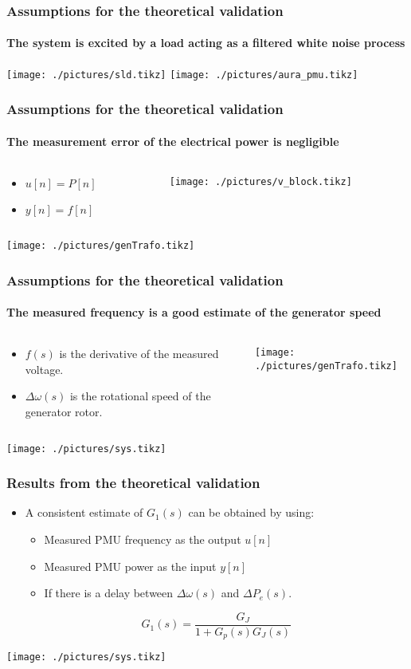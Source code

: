 \begin{frame}
	\frametitle{Assumptions for the theoretical validation}
	\framesubtitle{The system is excited by a load acting as a filtered white noise process}
	\texttt{[image: ./pictures/sld.tikz]}
	\texttt{[image: ./pictures/aura\_pmu.tikz]}
\end{frame}
\begin{frame}
	\frametitle{Assumptions for the theoretical validation}
	\framesubtitle{The measurement error of the electrical power is negligible}
	\begin{columns}
		\begin{column}{0.5\textwidth}
			\begin{itemize}
				\item $u[n] = P[n]$
				\item $y[n] = f[n]$
			\end{itemize}
		\end{column}
		\begin{column}{0.5\textwidth}
			\texttt{[image: ./pictures/v\_block.tikz]}
		\end{column}
	\end{columns}
	\texttt{[image: ./pictures/genTrafo.tikz]}
\end{frame}
\begin{frame}
	\frametitle{Assumptions for the theoretical validation}
	\framesubtitle{The measured frequency is a good estimate of the generator speed}
	\begin{columns}
		\begin{column}{0.35\textwidth}
			\begin{itemize}
				\item $f(s)$ is the derivative of the measured voltage.
				\item $\Delta \omega(s)$ is the rotational speed of the generator rotor.
			\end{itemize}
		\end{column}
		\begin{column}{0.65\textwidth}
				\texttt{[image: ./pictures/genTrafo.tikz]}
		\end{column}
	\end{columns}
	\texttt{[image: ./pictures/sys.tikz]}
\end{frame}
\begin{frame}
	\frametitle{Results from the theoretical validation}
	\begin{itemize}
		\item A consistent estimate of $G_1(s)$ can be obtained by using:
		\begin{itemize}
			\item Measured PMU frequency as the output $u[n]$
			\item Measured PMU power as the input $y[n]$
			\item If there is a delay between $\Delta \omega(s)$ and $\Delta P_e(s)$.
		\end{itemize}
		\begin{equation*}
			G_1(s) = \frac{G_{J}}{1+G_p(s)G_J(s)}
		\end{equation*}
	\end{itemize}
	\texttt{[image: ./pictures/sys.tikz]}
\end{frame}
